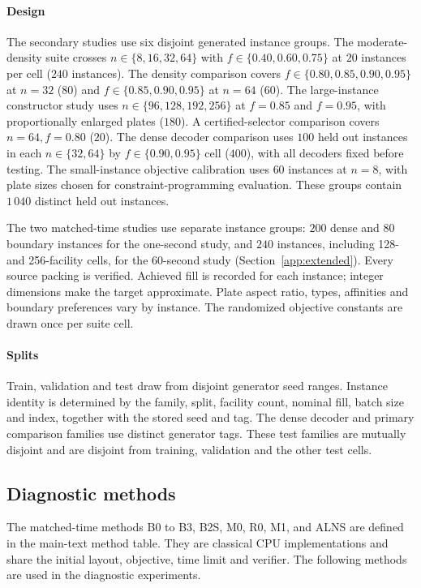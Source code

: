 \documentclass[11pt]{article}
\begin{document}
\paragraph{Design}
The secondary studies use six disjoint generated instance groups. The
moderate-density suite crosses $n\in\{8,16,32,64\}$ with
$f\in\{0.40,0.60,0.75\}$ at $20$ instances per cell ($240$ instances).
The density comparison covers $f\in\{0.80,0.85,0.90,0.95\}$ at $n=32$
($80$) and $f\in\{0.85,0.90,0.95\}$ at $n=64$ ($60$).
The large-instance constructor study uses $n\in\{96,128,192,256\}$ at
$f=0.85$ and $f=0.95$, with proportionally enlarged plates ($180$).
A certified-selector comparison covers $n=64,f=0.80$ ($20$).
The dense decoder comparison uses $100$ held out instances in each
$n\in\{32,64\}$ by $f\in\{0.90,0.95\}$ cell ($400$), with all decoders
fixed before testing. The small-instance objective calibration uses $60$
instances at $n=8$, with plate sizes chosen for constraint-programming
evaluation. These groups contain $1\,040$ distinct held out instances.

The two matched-time studies use separate instance groups: $200$ dense and
$80$ boundary instances for the one-second study, and $240$ instances,
including 128- and 256-facility cells, for the 60-second study
(Section~\ref{app:extended}). Every source packing is verified.
Achieved fill is recorded for each instance; integer dimensions make the target
approximate. Plate aspect ratio, types, affinities and boundary preferences vary
by instance. The randomized objective constants are drawn once per suite cell.

\paragraph{Splits}
Train, validation and test draw from disjoint generator seed ranges. Instance
identity is determined by the family, split, facility count, nominal fill,
batch size and index, together with the stored seed and tag.
The dense decoder and primary comparison families
use distinct generator tags. These test families are mutually disjoint and
are disjoint from training, validation and the other test cells.

\subsection{Diagnostic methods}
The matched-time methods B0 to B3, B2S, M0, R0, M1, and ALNS are defined in
the main-text method table. They are classical CPU implementations and share
the initial layout, objective, time limit and verifier. The following methods
are used in the diagnostic experiments.
\end{document}
